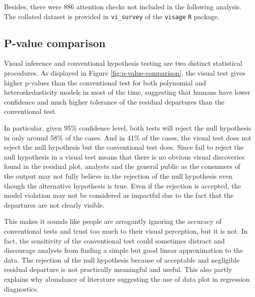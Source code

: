 \documentclass[]{interact}
\theoremstyle{plain}%
\theoremstyle{definition}
\theoremstyle{remark}
\begin{document}
Besides, there were 886 attention checks not included in the following
analysis. The collated dataset is provided in \texttt{vi\_survey} of the
\texttt{visage} \texttt{R} package.

\hypertarget{p-value-comparison}{%
\subsection{P-value comparison}\label{p-value-comparison}}

Visual inference and conventional hypothesis testing are two distinct
statistical procedures. As displayed in Figure
\ref{fig:p-value-comparison}, the visual test gives higher p-values than
the conventional test for both polynomial and heteroskedasticity models
in most of the time, suggesting that humans have lower confidence and
much higher tolerance of the residual departures than the conventional
test.

In particular, given 95\% confidence level, both tests will reject the
null hypothesis in only around 58\% of the cases. And in 41\% of the
cases, the visual test does not reject the null hypothesis but the
conventional test does. Since fail to reject the null hypothesis in a
visual test means that there is no obvious visual discoveries found in
the residual plot, analysts and the general public as the consumers of
the output may not fully believe in the rejection of the null hypothesis
even though the alternative hypothesis is true. Even if the rejection is
accepted, the model violation may not be considered as impactful due to
the fact that the departures are not clearly visible.

This makes it sounds like people are arrogantly ignoring the accuracy of
conventional tests and trust too much to their visual perception, but it
is not. In fact, the sensitivity of the conventional test could
sometimes distract and discourage analysts from finding a simple but
good linear approximation to the data. The rejection of the null
hypothesis because of acceptable and negligible residual departure is
not practically meaningful and useful. This also partly explains why
abundance of literature suggesting the use of data plot in regression
diagnostics.
\end{document}
